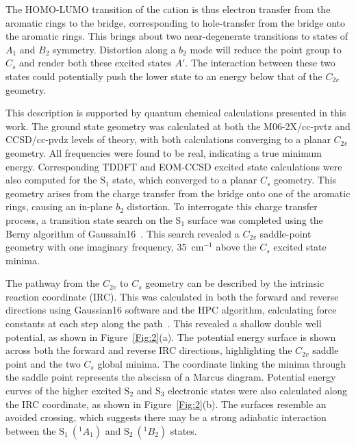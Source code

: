 \documentclass[journal=jpcafh,manuscript=article,layout=onecolumn, 12pt]{achemso}
\begin{document}
The HOMO-LUMO transition of the cation is thus electron transfer from the aromatic rings to the bridge, corresponding to hole-transfer from the bridge onto the aromatic rings. This brings about two near-degenerate transitions to states of $A_1$ and $B_2$ symmetry. Distortion along a $b_2$ mode will reduce the point group to $C_s$ and render both these excited states $A'$. The interaction between these two states could potentially push the lower state to an energy below that of the $C_{2v}$ geometry.

This description is supported by quantum chemical calculations presented in this work. The ground state geometry was calculated at both the M06-2X/cc-pvtz and CCSD/cc-pvdz levels of theory, with both calculations converging to a planar $C_{2v}$ geometry. All frequencies were found to be real, indicating a true minimum energy. Corresponding TDDFT and EOM-CCSD excited state calculations were also computed for the S$_1$ state, which converged to a planar $C_s$ geometry. This geometry arises from the charge transfer from the bridge onto one of the aromatic rings, causing an in-plane $b_2$ distortion. To interrogate this charge transfer process, a transition state search on the S$_1$ surface was completed using the Berny algorithm of Gaussain16~\cite{g16,ber82}. This search revealed a $C_{2v}$ saddle-point geometry with one imaginary frequency, 35~cm$^{-1}$ above the $C_s$ excited state minima.

The pathway from the $C_{2v}$ to $C_s$ geometry can be described by the intrinsic reaction coordinate (IRC). This was calculated in both the forward and reverse directions using Gaussian16 software and the HPC algorithm, calculating force constants at each step along the path~\cite{hra04}. This revealed a shallow double well potential, as shown in Figure~\ref{Fig:2}(a). The potential energy surface is shown across both the forward and reverse IRC directions, highlighting the $C_{2v}$ saddle point and the two $C_s$ global minima. The coordinate linking the minima through the saddle point represents the abscissa of a Marcus diagram. Potential energy curves of the higher excited $\text{S}_2$ and $\text{S}_3$ electronic states were also calculated along the IRC coordinate, as shown in Figure~\ref{Fig:2}(b). The surfaces resemble an avoided crossing, which suggests there may be a strong adiabatic interaction between the $\text{S}_1~(^1A_1)$ and $\text{S}_2~(^1B_2)$ states.  
\end{document}
